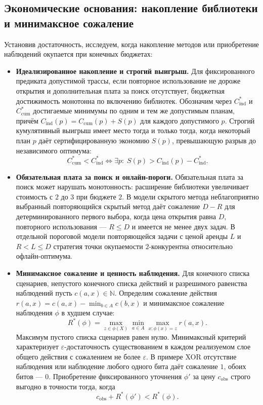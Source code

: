 \documentclass[10pt,a4paper]{article}
\begin{document}
\newpage
\subsection{Экономические основания: накопление библиотеки и минимаксное сожаление}
Установив достаточность, исследуем, когда накопление методов или приобретение наблюдений окупается при конечных бюджетах:
\begin{itemize}
    \item \textbf{Идеализированное накопление и строгий выигрыш.} Для фиксированного предиката допустимой трассы, если повторное использование не дороже открытия и дополнительная плата за поиск отсутствует, бюджетная достижимость монотонна по включению библиотек. Обозначим через $C_{\mathrm{ind}}^*$ и $C_{\mathrm{cum}}^*$ достигаемые минимумы по одним и тем же допустимым планам, причём $C_{\mathrm{ind}}(p)=C_{\mathrm{cum}}(p)+S(p)$ для каждого допустимого $p$. Строгий кумулятивный выигрыш имеет место тогда и только тогда, когда некоторый план $p$ даёт сертифицированную экономию $S(p)$, превышающую разрыв до независимого оптимума:
    \begin{equation}
    \label{eq:t15}
    C_{\mathrm{cum}}^* < C_{\mathrm{ind}}^* \iff \exists p :\; S(p) > C_{\mathrm{ind}}(p) - C_{\mathrm{ind}}^*.
    \end{equation}
    \item \textbf{Обязательная плата за поиск и онлайн-пороги.} Обязательная плата за поиск может нарушать монотонность: расширение библиотеки увеличивает стоимость с $2$ до $3$ при бюджете $2$. В модели скрытого метода неблагоприятно выбранный повторяющийся скрытый метод даёт сожаление $D-R$ для детерминированного первого выбора, когда цена открытия равна $D$, повторного использования --- $R\le D$ и имеется не менее двух задач. В отдельной пороговой модели повторяющейся задачи с ценой аренды $L$ и $R<L\le D$ стратегия точки окупаемости $2$-конкурентна относительно офлайн-оптимума.
    \item \textbf{Минимаксное сожаление и ценность наблюдения.} Для конечного списка сценариев, непустого конечного списка действий и разрешимого равенства наблюдений пусть $c(a,x)\in\mathbb N$. Определим сожаление действия $r(a,x) = c(a,x) - \min_{b \in A} c(b,x)$ и минимаксное сожаление наблюдения $\phi$ в худшем случае:
    \begin{equation}
    \label{eq:t18-regret}
    R^*(\phi) = \max_{z \in \phi(X)} \min_{a \in A} \max_{x : \phi(x)=z} r(a,x).
    \end{equation}
    Максимум пустого списка сценариев равен нулю. Минимаксный критерий характеризует $\varepsilon$-достаточность существованием в каждом реализуемом слое общего действия с сожалением не более $\varepsilon$. В примере XOR отсутствие наблюдения или наблюдение любого одного бита даёт сожаление $1$, обоих битов --- $0$. Приобретение фиксированного уточнения $\phi'$ за цену $c_{\mathrm{obs}}$ строго выгодно в точности тогда, когда
    \begin{equation}
    \label{eq:t18-acq}
    c_{\mathrm{obs}} + R^*(\phi') < R^*(\phi).
    \end{equation}
\end{itemize}
\end{document}
